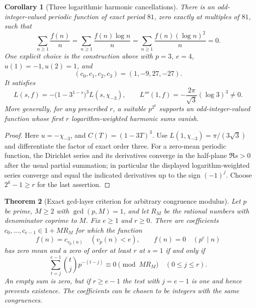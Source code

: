 \documentclass[11pt,a4paper]{article}
\newtheorem{theorem}{Theorem}[section]
\newtheorem{corollary}[theorem]{Corollary}
\theoremstyle{definition}
\theoremstyle{remark}
\numberwithin{equation}{section}
\begin{document}
\begin{corollary}[Three logarithmic harmonic cancellations]
\label{arb:81}
There is an odd-integer-valued periodic function of exact period
\(81\), zero exactly at multiples of \(81\), such that
\[
 \sum_{n\geq1}\frac{f(n)}n
 =\sum_{n\geq1}\frac{f(n)\log n}n
 =\sum_{n\geq1}\frac{f(n)(\log n)^2}n=0.
\]
One explicit choice is the construction above with \(p=3\),
\(e=4\), \(u(1)=-1,u(2)=1\), and
\[
 (c_0,c_1,c_2,c_3)=(1,-9,27,-27).
\]
It satisfies
\[
 L(s,f)=-\bigl(1-3^{1-s}\bigr)^3L(s,\chi_{-3}),
 \qquad
 L'''(1,f)=-\frac{2\pi}{\sqrt3}(\log3)^3\ne0.
\]
More generally, for any prescribed \(r\), a suitable
\(p^{2^k}\) supports an odd-integer-valued function whose first
\(r\) logarithm-weighted harmonic sums vanish.
\end{corollary}

\begin{proof}
Here \(u=-\chi_{-3}\), and \(C(T)=(1-3T)^3\).
Use \(L(1,\chi_{-3})=\pi/(3\sqrt3)\) and differentiate the
factor of exact order three.  For a zero-mean periodic function,
the Dirichlet series and its derivatives converge in the half-plane
\(\Re s>0\) after the usual partial summation; in particular the
displayed logarithm-weighted series converge and equal the indicated
derivatives up to the sign \((-1)^j\).
Choose \(2^k-1\geq r\) for the last assertion.
\end{proof}

\begin{theorem}[Exact gcd-layer criterion for arbitrary congruence modulus]
\label{arb:gcdlayers}
Let \(p\) be prime, \(M\geq2\) with \(\gcd(p,M)=1\), and
let \(R_M\) be the rational numbers with denominator coprime to
\(M\).  Fix \(e\geq1\) and \(r\geq0\).
There are coefficients \(c_0,\ldots,c_{e-1}\in1+MR_M\)
for which the function
\[
 f(n)=c_{v_p(n)}\quad(v_p(n)<e),\qquad f(n)=0\quad(p^e\mid n)
\]
has zero mean and a zero of order at least \(r\) at \(s=1\)
if and only if
\begin{equation}\label{arb:hasse}
 \sum_{t=j}^{e-1}\binom tj p^{-(t-j)}\equiv0\pmod{MR_M}
                  \quad(0\leq j\leq r).
\end{equation}
An empty sum is zero, but if \(r\geq e-1\) the test with
\(j=e-1\) is one and hence prevents existence.
The coefficients can be chosen to be integers with the same
congruences.
\end{theorem}
\end{document}
